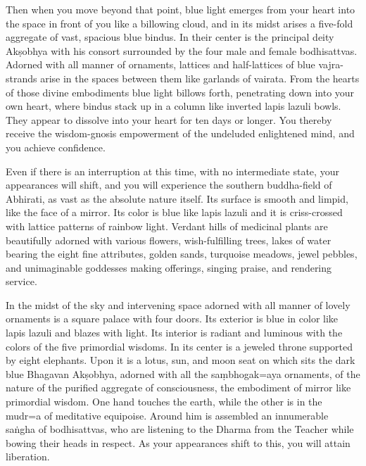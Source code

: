 \documentclass[11pt,twocolumn]{article}
\begin{document}
Then when you move beyond that point, blue light emerges from your
heart into the space in front of you like a billowing cloud, and in
its midst arises a five\hyp{}fold aggregate of vast, spacious blue
bindus. In their center is the principal deity Ak\d{s}obhya with his
consort surrounded by the four male and female bodhisattvas. Adorned
with all manner of ornaments, lattices and half\hyp{}lattices of blue
vajra\hyp{}strands arise in the spaces between them like garlands of
vairata. From the hearts of those divine embodiments blue light
billows forth, penetrating down into your own heart, where bindus
stack up in a column like inverted lapis lazuli bowls. They appear to
dissolve into your heart for ten days or longer. You thereby receive
the wisdom\hyp{}gnosis empowerment of the undeluded enlightened mind,
and you achieve confidence.

Even if there is an interruption at this time, with no intermediate
state, your appearances will shift, and you will experience the
southern buddha\hyp{}field of Abhirati, as vast as the absolute nature
itself. Its surface is smooth and limpid, like the face of a
mirror. Its color is blue like lapis lazuli and it is
criss\hyp{}crossed with lattice patterns of rainbow light. Verdant
hills of medicinal plants are beautifully adorned with various
flowers, wish\hyp{}fulfilling trees, lakes of water bearing the eight
fine attributes, golden sands, turquoise meadows, jewel pebbles, and
unimaginable goddesses making offerings, singing praise, and rendering
service.

In the midst of the sky and intervening space adorned with all manner
of lovely ornaments is a square palace with four doors. Its exterior
is blue in color like lapis lazuli and blazes with light. Its interior
is radiant and luminous with the colors of the five primordial
wisdoms. In its center is a jeweled throne supported by eight
elephants. Upon it is a lotus, sun, and moon seat on which sits the
dark blue Bhagavan Ak\d{s}obhya, adorned with all the
sa\d{m}bhogak\a={a}ya ornaments, of the nature of the purified
aggregate of consciousness, the embodiment of mirror like primordial
wisdom. One hand touches the earth, while the other is in the
mudr\a={a} of meditative equipoise.  Around him is assembled an
innumerable sa\.{n}gha of bodhisattvas, who are listening to the
Dharma from the Teacher while bowing their heads in respect. As your
appearances shift to this, you will attain liberation.
\end{document}

